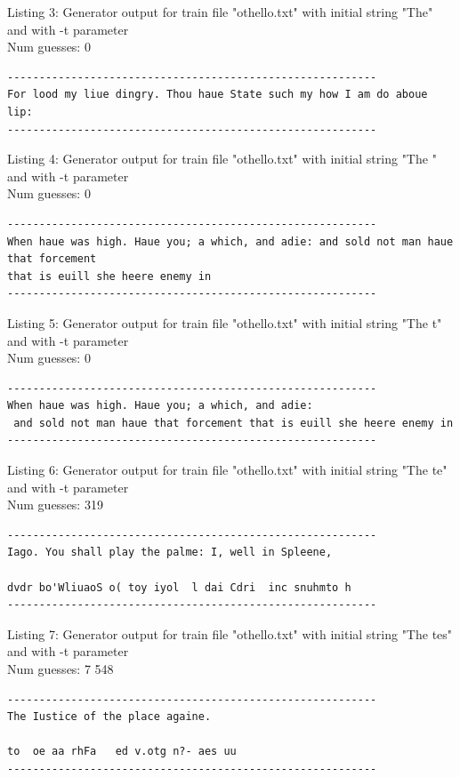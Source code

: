 \documentclass{article}
\begin{document}
Listing 3: Generator output for train file "othello.txt" with initial string "The" and with -t parameter
\\Num guesses: 0

\begin{lstlisting}
----------------------------------------------------------
For lood my liue dingry. Thou haue State such my how I am do aboue lip:
----------------------------------------------------------
\end{lstlisting}

Listing 4: Generator output for train file "othello.txt" with initial string "The " and with -t parameter
\\Num guesses: 0

\begin{lstlisting}
----------------------------------------------------------
When haue was high. Haue you; a which, and adie: and sold not man haue that forcement 
that is euill she heere enemy in
----------------------------------------------------------
\end{lstlisting}

Listing 5: Generator output for train file "othello.txt" with initial string "The t" and with -t parameter
\\Num guesses: 0

\begin{lstlisting}
----------------------------------------------------------
When haue was high. Haue you; a which, and adie:
 and sold not man haue that forcement that is euill she heere enemy in
----------------------------------------------------------
\end{lstlisting}

Listing 6: Generator output for train file "othello.txt" with initial string "The te" and with -t parameter
\\Num guesses: 319

\begin{lstlisting}
----------------------------------------------------------
Iago. You shall play the palme: I, well in Spleene,

dvdr bo'WliuaoS o( toy iyol  l dai Cdri  inc snuhmto h 
----------------------------------------------------------
\end{lstlisting}

Listing 7: Generator output for train file "othello.txt" with initial string "The tes" and with -t parameter
\\Num guesses: 7 548

\begin{lstlisting}
----------------------------------------------------------
The Iustice of the place againe.

to  oe aa rhFa   ed v.otg n?- aes uu
----------------------------------------------------------
\end{lstlisting}
\end{document}
